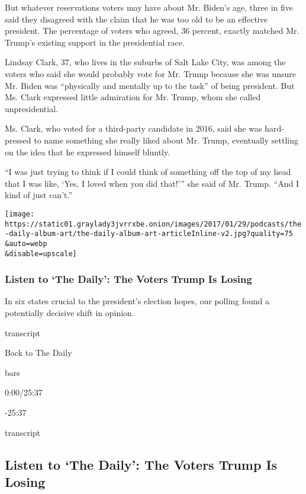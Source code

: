 But whatever reservations voters may have about Mr. Biden's age, three
in five said they disagreed with the claim that he was too old to be an
effective president. The percentage of voters who agreed, 36 percent,
exactly matched Mr. Trump's existing support in the presidential race.

Lindsay Clark, 37, who lives in the suburbs of Salt Lake City, was among
the voters who said she would probably vote for Mr. Trump because she
was unsure Mr. Biden was ``physically and mentally up to the task'' of
being president. But Ms. Clark expressed little admiration for Mr.
Trump, whom she called unpresidential.

Ms. Clark, who voted for a third-party candidate in 2016, said she was
hard-pressed to name something she really liked about Mr. Trump,
eventually settling on the idea that he expressed himself bluntly.

``I was just trying to think if I could think of something off the top
of my head that I was like, `Yes, I loved when you did that!''' she said
of Mr. Trump. ``And I kind of just can't.''

\texttt{[image: https://static01.graylady3jvrrxbe.onion/images/2017/01/29/podcasts/the-daily-album-art/the-daily-album-art-articleInline-v2.jpg?quality=75\\\&auto=webp\\\&disable=upscale]}

\hypertarget{listen-to-the-daily-the-voters-trump-is-losing}{%
\subsubsection{Listen to `The Daily': The Voters Trump Is
Losing}\label{listen-to-the-daily-the-voters-trump-is-losing}}

In six states crucial to the president's election hopes, our polling
found a potentially decisive shift in opinion.

transcript

Back to The Daily

bars

0:00/25:37

-25:37

transcript

\hypertarget{listen-to-the-daily-the-voters-trump-is-losing-1}{%
\subsection{Listen to `The Daily': The Voters Trump Is
Losing}\label{listen-to-the-daily-the-voters-trump-is-losing-1}}

